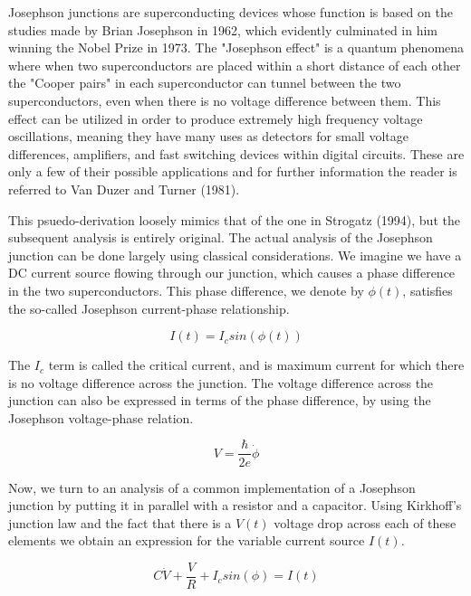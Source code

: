 \documentclass[12pt]{article}
\begin{document}
Josephson junctions are superconducting devices whose function is based on the studies made by Brian Josephson in 1962, which evidently culminated in him winning the Nobel Prize in 1973.  The "Josephson effect" is a quantum phenomena where when two superconductors are placed within a short distance of each other the "Cooper pairs" in each superconductor can tunnel between the two superconductors, even when there is no voltage difference between them.  This effect can be utilized in order to produce extremely high frequency voltage oscillations, meaning they have many uses as detectors for small voltage differences, amplifiers, and fast switching devices within digital circuits.  These are only a few of their possible applications and for further information the reader is referred to Van Duzer and Turner (1981).


This psuedo-derivation loosely mimics that of the one in Strogatz (1994), but the subsequent analysis is entirely original. The actual analysis of the Josephson junction can be done largely using classical considerations.  We imagine we have a DC current source flowing through our junction, which causes a phase difference in the two superconductors.  This phase difference, we denote by $\phi(t)$, satisfies the so-called Josephson current-phase relationship.

\begin{equation}
I(t) = I_c sin(\phi(t))
\end{equation}

The $I_c$ term is called the critical current, and is maximum current for which there is no voltage difference across the junction.  The voltage difference across the junction can also be expressed in terms of the phase difference, by using the Josephson voltage-phase relation.

\begin{equation}
V = \dfrac{\hbar}{2e} \dot{\phi}
\end{equation}

Now, we turn to an analysis of a common implementation of a Josephson junction by putting it in parallel with a resistor and a capacitor.  Using Kirkhoff's junction law and the fact that there is a $V(t)$ voltage drop across each of these elements we obtain an expression for the variable current source $I(t)$.

\begin{equation}
C \dot{V} +\dfrac{V}{R} + I_c sin(\phi) = I(t)
\end{equation}
\end{document}
